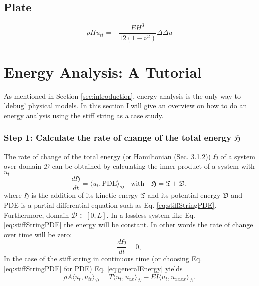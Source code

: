 \documentclass{article}
\begin{document}
\subsection{Plate}
\begin{equation}
    \rho H u_{tt} = -\frac{EH^3}{12(1-\nu^2)}\Delta\Delta u
\end{equation}
\section{Energy Analysis: A Tutorial}\label{sec:energy}
As mentioned in Section \ref{sec:introduction}, energy analysis is the only way to 'debug' physical models. In this section I will give an overview on how to do an energy analysis using the stiff string as a case study. 

\subsubsection*{Step 1: Calculate the rate of change of the total energy $\mathfrak{H}$} %
The rate of change of the total energy (or Hamiltonian (Sec. 3.1.2)) $\mathfrak{H}$ of a system over domain $\mathcal{D}$ can be obtained by calculating the inner product of a system with $u_t$ \cite{Desv2017}
\begin{equation}\label{eq:generalEnergy}
    \frac{d \mathfrak{H}}{dt} = \langle u_t, \text{PDE} \rangle_\mathcal{D} \quad \text{with} \quad \mathfrak{H} = \mathfrak{T} + \mathfrak{D},
\end{equation}
where $\mathfrak{H}$ is the addition of its kinetic energy $\mathfrak{T}$ and its potential energy $\mathfrak{D}$ and PDE is a partial differential equation such as Eq. \eqref{eq:stiffStringPDE}. Furthermore, domain $\mathcal{D} \in [0,L]$. In a lossless system like Eq. \eqref{eq:stiffStringPDE} the energy will be constant. In other words the rate of change over time will be zero:
\begin{equation}\label{eq:energyZero}
    \frac{d \mathfrak{H}}{dt} = 0,
\end{equation}
In the case of the stiff string in continuous time (or choosing Eq. \eqref{eq:stiffStringPDE} for PDE) Eq. \eqref{eq:generalEnergy} yields
\begin{equation}\label{eq:stiffStringInnerProduct}
     \rho A \langle u_t, u_{tt}\rangle_\mathcal{D} = T \langle u_t, u_{xx}\rangle_\mathcal{D} - EI \langle u_t, u_{xxxx} \rangle_\mathcal{D}.
\end{equation}
\end{document}
